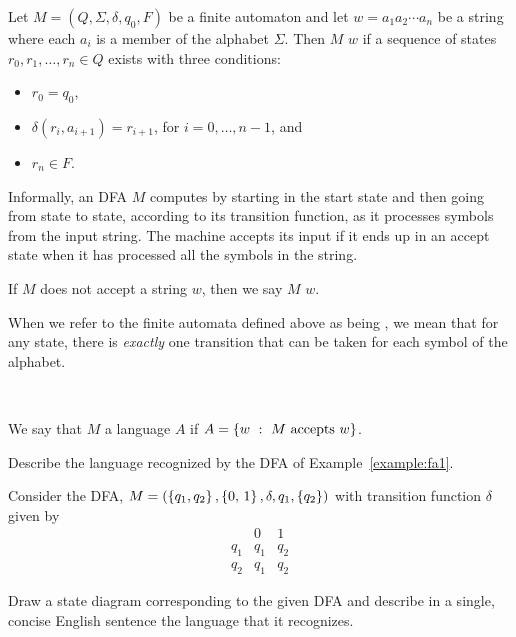 \documentclass[twoside,letterpaper,openany]{book}
\begin{document}
\begin{defn}
Let $M = (Q, \Sigma, \delta, q_0, F)$ be a finite automaton and let $w = a_1a_2\cdots a_n$ be a string where each $a_i$ is a member of the alphabet $\Sigma$. Then $M$  $w$ if a sequence of states $r_0, r_1, \ldots, r_n \in Q$ exists with three conditions:
\begin{itemize}
\item $r_0 = q_0$,
\item $\delta(r_i, a_{i+1}) = r_{i+1}$, for $i = 0, \ldots, n-1$, and
\item $r_n \in F$.
\end{itemize}

Informally, an DFA $M$ computes by starting in the start state and then going from state to state, according to its transition function, as it processes symbols from the input string. The machine accepts its input if it ends up in an accept state when it has processed all the symbols in the string.

If $M$ does not accept a string $w$, then we say $M$  $w$.
\end{defn}

\begin{discussion}
When we refer to the finite automata  defined above as being , we mean that for any state, there is \emph{exactly} one transition that can be taken for each symbol of the alphabet.
\end{discussion}

~

\begin{defn}
We say that $M$  a language $A$ if $A = \setbuild{w}{M \ \textrm{accepts}\ w}$.
\end{defn}

\begin{exer1}
Describe the language recognized by the DFA of Example~\ref{example:fa1}.
\end{exer1}

\begin{exer2}
Consider the DFA, $M = (\left\lbrace q_1, q_2 \right\rbrace, \left\lbrace \textrm{0, 1} \right\rbrace, \delta, q_1, \left\lbrace q_2 \right\rbrace)$ with transition function $\delta$ given by
\[\begin{array}{c|cc}
 & \textrm{0} & \textrm{1} \\ \hline
 q_1 & q_1 & q_2 \\
 q_2 & q_1 & q_2
\end{array}\]

Draw a state diagram corresponding to the given DFA and describe in a single, concise English sentence the language that it recognizes.
\end{exer2}
\end{document}
